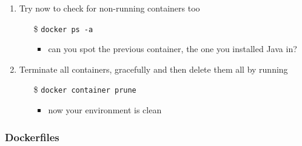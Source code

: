 \documentclass[presentation]{beamer}\mode<presentation>{\usetheme{AMSBolognaFC}}
\begin{document}
\begin{frame}[allowframebreaks]
\begin{enumerate}
        \item Try now to check for non-running containers too
        \begin{itemize}
            \item[\$] \texttt{docker ps \alert{-a}}
            \begin{itemize}
                \item can you spot the previous container, the one you installed Java in?
            \end{itemize}
        \end{itemize}

        \item Terminate all containers, gracefully and then delete them all by running
        \begin{itemize}
            \item[\$] \texttt{docker container \alert{prune}}
            \begin{itemize}
                \item now your environment is clean
            \end{itemize}
        \end{itemize}

    \end{enumerate}

\end{frame}

\subsubsection{Dockerfiles}
\end{document}

